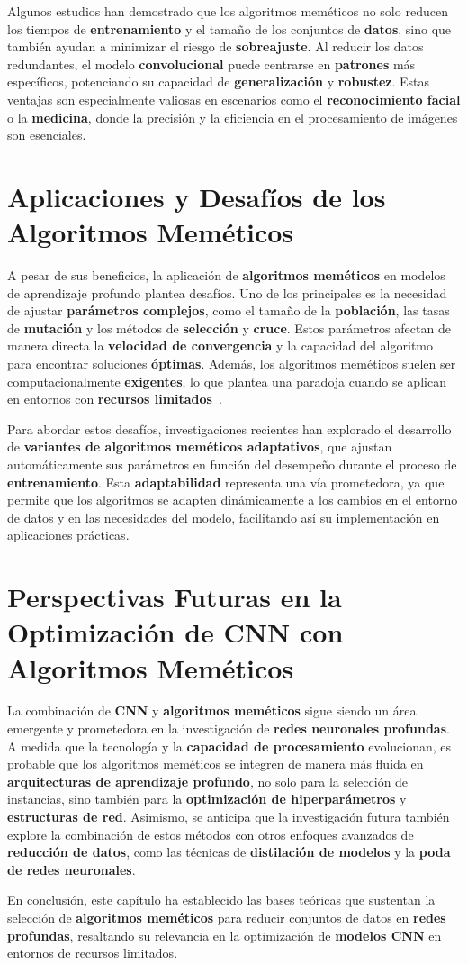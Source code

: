 Algunos estudios han demostrado que los algoritmos meméticos no solo reducen los tiempos de \textbf{entrenamiento} y el
tamaño de los conjuntos de \textbf{datos}, sino que también ayudan a minimizar el riesgo de \textbf{sobreajuste}.
Al reducir los datos redundantes, el modelo \textbf{convolucional} puede centrarse en \textbf{patrones} más
específicos, potenciando su capacidad de \textbf{generalización} y \textbf{robustez}.
Estas ventajas son especialmente valiosas en escenarios como el \textbf{reconocimiento facial} o la \textbf{medicina},
donde la precisión y la eficiencia en el procesamiento de imágenes son esenciales.


\section{Aplicaciones y Desafíos de los Algoritmos Meméticos}
\label{sec:aplicaciones-y-desafios-de-los-algoritmos-memeticos}
A pesar de sus beneficios, la aplicación de \textbf{algoritmos meméticos} en modelos de aprendizaje profundo plantea
desafíos.
Uno de los principales es la necesidad de ajustar \textbf{parámetros complejos}, como el tamaño de la
\textbf{población}, las tasas de \textbf{mutación} y los métodos de \textbf{selección} y \textbf{cruce}.
Estos parámetros afectan de manera directa la \textbf{velocidad de convergencia} y la capacidad del algoritmo para
encontrar soluciones \textbf{óptimas}.
Además, los algoritmos meméticos suelen ser computacionalmente \textbf{exigentes}, lo que plantea una paradoja cuando
se aplican en entornos con \textbf{recursos limitados}~\cite{Goldberg, 1989}.


Para abordar estos desafíos, investigaciones recientes han explorado el desarrollo de
\textbf{variantes de algoritmos meméticos adaptativos}, que ajustan automáticamente sus parámetros en función del
desempeño durante el proceso de \textbf{entrenamiento}.
Esta \textbf{adaptabilidad} representa una vía prometedora, ya que permite que los algoritmos se adapten dinámicamente
a los cambios en el entorno de datos y en las necesidades del modelo, facilitando así su implementación en aplicaciones
prácticas.


\section{Perspectivas Futuras en la Optimización de CNN con Algoritmos Meméticos}
\label{sec:perspectivas-futuras-en-la-optimizacion-de-cnn-con-algoritmos-memeticos}
La combinación de \textbf{CNN} y \textbf{algoritmos meméticos} sigue siendo un área emergente y prometedora en la
investigación de \textbf{redes neuronales profundas}.
A medida que la tecnología y la \textbf{capacidad de procesamiento} evolucionan, es probable que los algoritmos
meméticos se integren de manera más fluida en \textbf{arquitecturas de aprendizaje profundo}, no solo para la selección
de instancias, sino también para la \textbf{optimización de hiperparámetros} y \textbf{estructuras de red}.
Asimismo, se anticipa que la investigación futura también explore la combinación de estos métodos con otros enfoques
avanzados de \textbf{reducción de datos}, como las técnicas de \textbf{distilación de modelos} y la
\textbf{poda de redes neuronales}.


En conclusión, este capítulo ha establecido las bases teóricas que sustentan la selección de
\textbf{algoritmos meméticos} para reducir conjuntos de datos en \textbf{redes profundas}, resaltando su relevancia en
la optimización de \textbf{modelos CNN} en entornos de recursos limitados.
